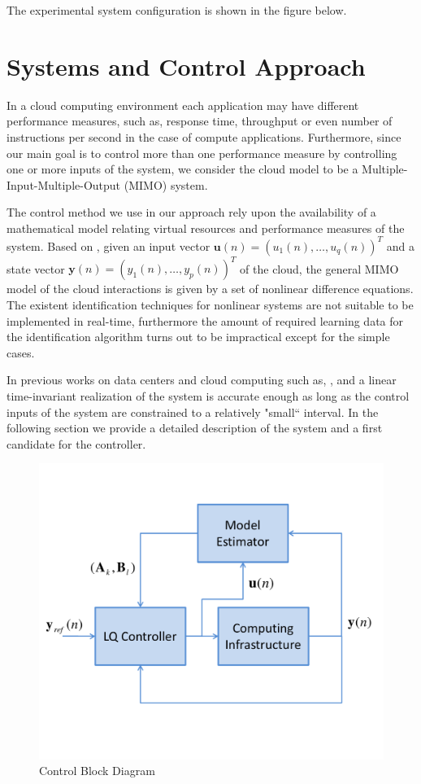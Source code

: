 \documentclass{sig-alternate}
\begin{document}
The experimental system configuration is shown in the figure below.

\section{Systems and Control Approach}
In a cloud computing environment each application may have different performance measures, such as, response time, 
throughput or even number of instructions per second in the case of compute applications. Furthermore, since our main goal is
to control more than one performance measure by controlling one or more inputs of the system,
we consider the cloud model to be a Multiple-Input-Multiple-Output (MIMO) system.

The control method we use in our approach rely upon the availability of a mathematical model relating virtual resources
and performance measures of the system. Based on \cite{Nathuji-2010}, given an input vector 
$\mathbf{u}(n) = (u_{1}(n),\ldots,u_{q}(n))^{T}$ and a
state vector $\mathbf{y}(n) = (y_{1}(n),\ldots,y_{p}(n))^{T}$ of the cloud, the general MIMO
model of the cloud interactions is given by a set of nonlinear difference equations. The existent identification 
techniques for nonlinear systems are not suitable to be implemented in real-time, furthermore the amount of required
learning data for the identification algorithm turns out to be impractical except for the simple cases.

In previous works on data centers and cloud computing such as, \cite{Nathuji-2010},\cite{Yao-ACC-2010} and \cite{Luna-2011b}
a linear time-invariant realization of the system is accurate enough as long as the control inputs of the system are
constrained to a relatively "small`` interval. In the following section we provide a detailed description of the system
and a first candidate for the controller.

\begin{figure}[h]
  \begin{center}
    \includegraphics[width=.49\textwidth]{Fig_Closed_Loop}
  \end{center}
  \caption{Control Block Diagram}
  \label{fig:control}
\end{figure}
\end{document}
